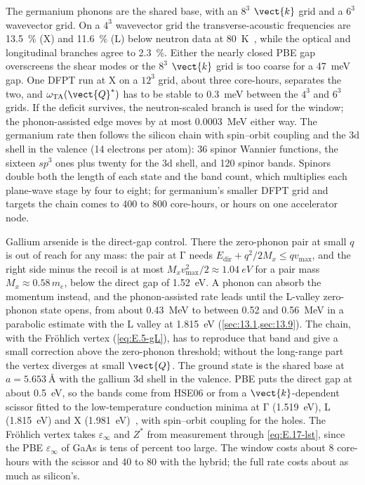 The germanium phonons are the shared base, with an $8^3$ $\vect{k}$ grid and a $6^3$ wavevector grid. On a $4^3$ wavevector grid the transverse-acoustic frequencies are \SI{13.5}{\percent} (X) and \SI{11.6}{\percent} (L) below neutron data at \SI{80}{K}~\cite{nilsson1971phonon}, while the optical and longitudinal branches agree to \SI{2.3}{\percent}. Either the nearly closed PBE gap overscreens the shear modes or the $8^3$ $\vect{k}$ grid is too coarse for a \SI{47}{meV} gap. One DFPT run at X on a $12^3$ grid, about three core-hours, separates the two, and $\omega_{\mathrm{TA}}(\vect{Q}^*)$ has to be stable to \SI{0.3}{meV} between the $4^3$ and $6^3$ grids. If the deficit survives, the neutron-scaled branch is used for the window; the phonon-assisted edge moves by at most \SI{0.0003}{MeV} either way. The germanium rate then follows the silicon chain with spin--orbit coupling and the 3d shell in the valence (14 electrons per atom): 36 spinor Wannier functions, the sixteen $sp^3$ ones plus twenty for the 3d shell, and 120 spinor bands. Spinors double both the length of each state and the band count, which multiplies each plane-wave stage by four to eight; for germanium's smaller DFPT grid and targets the chain comes to 400 to 800 core-hours, or hours on one accelerator node.

Gallium arsenide is the direct-gap control. There the zero-phonon pair at small $q$ is out of reach for any mass: the pair at $\mathrm{\Gamma}$ needs $E_{\mathrm{dir}} + q^2/2M_x \le qv_{\mathrm{max}}$, and the right side minus the recoil is at most $M_xv_{\mathrm{max}}^2/2 \approx \SI{1.04}{eV}$ for a pair mass $M_x \approx 0.58\,m_e$, below the direct gap of \SI{1.52}{eV}. A phonon can absorb the momentum instead, and the phonon-assisted rate leads until the L-valley zero-phonon state opens, from about \SI{0.43}{MeV} to between 0.52 and \SI{0.56}{MeV} in a parabolic estimate with the L valley at \SI{1.815}{eV} (\cref{sec:13.1,sec:13.9}). The chain, with the Fr\"ohlich vertex (\cref{eq:E.5-gL}), has to reproduce that band and give a small correction above the zero-phonon threshold; without the long-range part the vertex diverges at small $\vect{Q}$. The ground state is the shared base at $a = \SI{5.653}{\angstrom}$ with the gallium 3d shell in the valence. PBE puts the direct gap at about \SI{0.5}{eV}, so the bands come from HSE06 or from a $\vect{k}$-dependent scissor fitted to the low-temperature conduction minima at $\mathrm{\Gamma}$ (\SI{1.519}{eV}), L (\SI{1.815}{eV}) and X (\SI{1.981}{eV})~\cite{vurgaftman2001band}, with spin--orbit coupling for the holes. The Fr\"ohlich vertex takes $\varepsilon_\infty$ and $Z^*$ from measurement through \cref{eq:E.17-lst}, since the PBE $\varepsilon_\infty$ of GaAs is tens of percent too large. The window costs about 8 core-hours with the scissor and 40 to 80 with the hybrid; the full rate costs about as much as silicon's.

